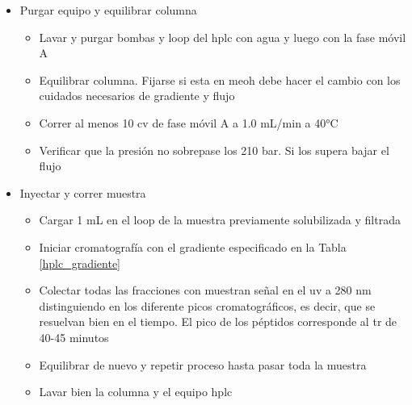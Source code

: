\begin{appendix}
\begin{itemize}
    \item{Purgar equipo y equilibrar columna}
     \begin{itemize}
        \item{Lavar y purgar bombas y loop del  \ac{hplc} con agua y luego con la fase móvil A}
        \item{Equilibrar columna. Fijarse si esta en \ac{meoh} debe hacer el cambio con los cuidados necesarios de gradiente y flujo}
        \item{Correr al menos 10 \ac{cv} de fase móvil A a 1.0 mL/min a 40°C}
        \item{Verificar que la presión no sobrepase los 210 bar. Si los supera bajar el flujo}
    \end{itemize}
\end{itemize}

\begin{itemize}
    \item{Inyectar y correr muestra}
     \begin{itemize}
        \item{Cargar 1 mL en el loop de la muestra previamente solubilizada y filtrada}
        \item{Iniciar cromatografía con el gradiente especificado en la Tabla \ref{hplc_gradiente}}
        \item{Colectar todas las fracciones con muestran señal en el \ac{uv} a 280 nm distinguiendo en los diferente picos cromatográficos, es decir, que se resuelvan bien en el tiempo. El pico de los péptidos corresponde al \ac{tr} de 40-45 minutos}
        \item{Equilibrar de nuevo y repetir proceso hasta pasar toda la muestra}
        \item{Lavar bien la columna y el equipo \ac{hplc}}
    \end{itemize}
\end{itemize}


\end{appendix}
